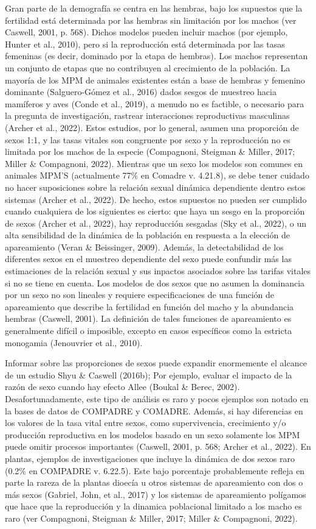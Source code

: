\documentclass[
  12pt,
  letterpaper,
]{book}
\begin{document}
Gran parte de la demografía se centra en las hembras, bajo los supuestos
que la fertilidad está determinada por las hembras sin limitación por
los machos (ver Caswell, 2001, p. 568). Dichos modelos pueden incluir
machos (por ejemplo, Hunter et al., 2010), pero si la reproducción está
determinada por las tasas femeninas (es decir, dominado por la etapa de
hembras). Los machos representan un conjunto de etapas que no
contribuyen al crecimiento de la población. La mayoría de los MPM de
animales existentes están a base de hembras y femenino dominante
(Salguero-Gómez et al., 2016) dados sesgos de muestreo hacia mamíferos y
aves (Conde et al., 2019), a menudo no es factible, o necesario para la
pregunta de investigación, rastrear interacciones reproductivas
masculinas (Archer et al., 2022). Estos estudios, por lo general, asumen
una proporción de sexos 1:1, y las tasas vitales son congruente por sexo
y la reproducción no es limitada por los machos de la especie
(Compagnoni, Steigman \& Miller, 2017; Miller \& Compagnoni, 2022).
Mientras que un sexo los modelos son comunes en animales MPM'S
(actualmente 77\% en Comadre v. 4.21.8), se debe tener cuidado no hacer
suposiciones sobre la relación sexual dinámica dependiente dentro estos
sistemas (Archer et al., 2022). De hecho, estos supuestos no pueden ser
cumplido cuando cualquiera de los siguientes es cierto: que haya un
sesgo en la proporción de sexos (Archer et al., 2022), hay reproducción
sesgadas (Sky et al., 2022), o un alta sensibilidad de la dinámica de la
población en respuesta a la elección de apareamiento (Veran \&
Beissinger, 2009). Además, la detectabilidad de los diferentes sexos en
el muestreo dependiente del sexo puede confundir más las estimaciones de
la relación sexual y sus inpactos asociados sobre las tarifas vitales si
no se tiene en cuenta. Los modelos de dos sexos que no asumen la
dominancia por un sexo no son lineales y requiere especificaciones de
una función de apareamiento que describe la fertilidad en función del
macho y la abundancia hembras (Caswell, 2001). La definición de tales
funciones de apareamiento es generalmente difícil o imposible, excepto
en casos específicos como la estricta monogamia (Jenouvrier et al.,
2010).

Informar sobre las proporciones de sexos puede expandir enormemente el
alcance de un estudio Shyu \& Caswell (2016b); Por ejemplo, evaluar el
impacto de la razón de sexo cuando hay efecto Allee (Boukal \& Berec,
2002). Desafortunadamente, este tipo de análisis es raro y pocos
ejemplos son notado en la bases de datos de COMPADRE y COMADRE. Además,
si hay diferencias en los valores de la tasa vital entre sexos, como
supervivencia, crecimiento y/o producción reproductiva en los modelos
basado en un sexo solamente los MPM puede omitir procesos importantes
(Caswell, 2001, p. 568; Archer et al., 2022). En plantas, ejemplos de
investigaciones que incluye la dinámica de dos sexos raro (0.2\% en
COMPADRE v. 6.22.5). Este bajo porcentaje probablemente refleja en parte
la rareza de la plantas dioecía u otros sistemas de apareamiento con dos
o más sexos (Gabriel, John, et al., 2017) y los sistemas de apareamiento
polígamos que hace que la reproducción y la dinamica poblacional
limitado a los macho es raro (ver Compagnoni, Steigman \& Miller, 2017;
Miller \& Compagnoni, 2022).
\end{document}
